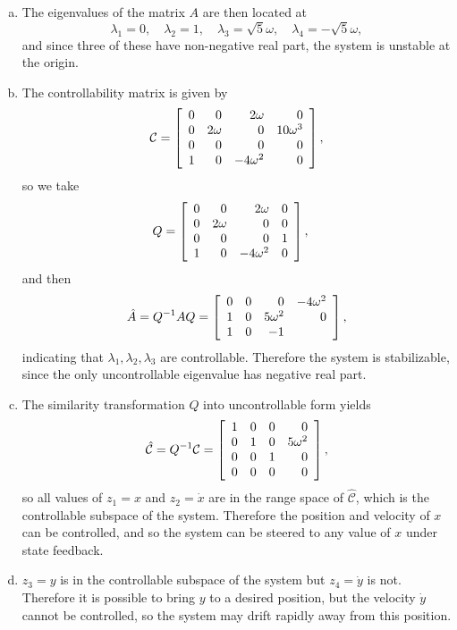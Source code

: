 \documentclass{article}
\begin{document}
\begin{enumerate}[(a)]
\item{
The eigenvalues of the matrix $A$ are then located at
$$
\lambda_1 = 0, \quad
\lambda_2 = 1, \quad
\lambda_3 =  \sqrt{5} \omega, \quad
\lambda_4 = -\sqrt{5} \omega,
$$
and since three of these have non-negative real part, the system is
unstable at the origin.
}
\item{
The controllability matrix is given by
$$
\mathcal{C} =
\left[\begin{array}{r r r r}
  0 &        0 &    2 \omega &           0 \\
  0 & 2 \omega &           0 & 10 \omega^3 \\
  0 &        0 &           0 &           0 \\
  1 &        0 & -4 \omega^2 &           0
\end{array}\right],
$$
so we take
$$
Q =
\left[\begin{array}{r r r r}
  0 &        0 &    2 \omega & 0 \\
  0 & 2 \omega &           0 & 0 \\
  0 &        0 &           0 & 1 \\
  1 &        0 & -4 \omega^2 & 0
\end{array}\right], \quad
$$
and then
$$
\hat{A} = Q^{-1} A Q =
\left[\begin{array}{r r r r}
  0 & 0 &           0 & -4 \omega^2 \\
  1 & 0 &  5 \omega^2 & 0 \\
  1 & 0 & -1
\end{array}\right],
$$
indicating that $\lambda_1, \lambda_2, \lambda_3$ are
controllable. Therefore the system is stabilizable, since the only
uncontrollable eigenvalue has negative real part.
}
\item{
The similarity transformation $Q$ into uncontrollable form yields
$$
\hat{\mathcal{C}} = Q^{-1} \mathcal{C} =
\left[\begin{array}{r r r r}
  1 & 0 & 0 &          0 \\
  0 & 1 & 0 & 5 \omega^2 \\
  0 & 0 & 1 &          0 \\
  0 & 0 & 0 &          0
\end{array}\right],
$$
so all values of $z_1 = x$ and $z_2 = \dot{x}$ are in the range space
of $\hat{\mathcal{C}}$, which is the controllable subspace of the
system. Therefore the position and velocity of $x$ can be controlled,
and so the system can be steered to any value of $x$ under state feedback.
}
\item{
$z_3 = y$ is in the controllable subspace of the system but
$z_4 = \dot{y}$ is not. Therefore it is possible to bring $y$ to a
  desired position, but the velocity $\dot{y}$ cannot be controlled,
  so the system may drift rapidly away from this position.
}
\end{enumerate}
\end{document}
